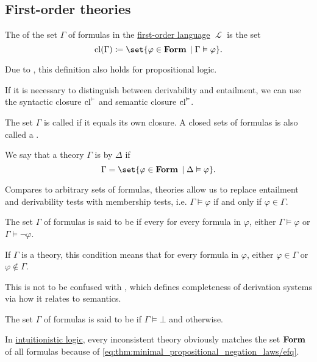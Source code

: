 \subsection{First-order theories}\label{subsec:first_order_theories}

\begin{definition}\label{def:first_order_theory}
  The  of the set \( \Gamma \) of formulas in the \hyperref[def:first_order_syntax]{first-order language} \( \mscrL \) is the set
  \begin{equation*}
    \cl(\Gamma) \coloneqq \set{ \varphi \in \boldop{Form} \given \Gamma \vDash \varphi }.
  \end{equation*}

  Due to , this definition also holds for propositional logic.

  If it is necessary to distinguish between derivability and entailment, we can use the syntactic closure \( \operatorname{cl}^\vdash \) and semantic closure \( \operatorname{cl}^\vDash \).

  The set \( \Gamma \) is called  if it equals its own closure. A closed sets of formulas is also called a .

  We say that a theory \( \Gamma \) is  by \( \Delta \) if
  \begin{equation*}
    \Gamma = \set{ \varphi \in \boldop{Form} \given \Delta \vDash \varphi }.
  \end{equation*}

  Compares to arbitrary sets of formulas, theories allow us to replace entailment and derivability tests with membership tests, i.e. \( \Gamma \vDash \varphi \) if and only if \( \varphi \in \Gamma \).

  \begin{thmenum}
     The set \( \Gamma \) of formulas is said to be  if every for every formula in \( \varphi \), either \( \Gamma \vDash \varphi \) or \( \Gamma \vDash \neg \varphi \).

    If \( \Gamma \) is a theory, this condition means that for every formula in \( \varphi \), either \( \varphi \in \Gamma \) or \( \varphi \not\in \Gamma \).

    This is not to be confused with , which defines completeness of derivation systems via how it relates to semantics.

     The set \( \Gamma \) of formulas is said to be  if \( \Gamma \vDash \bot \) and  otherwise.

    In \hyperref[def:intuitionistic_logic]{intuitionistic logic}, every inconsistent theory obviously matches the set \( \operatorname{\mathbf{Form}} \) of all formulas because of \eqref{eq:thm:minimal_propositional_negation_laws/efq}.
  \end{thmenum}
\end{definition}

